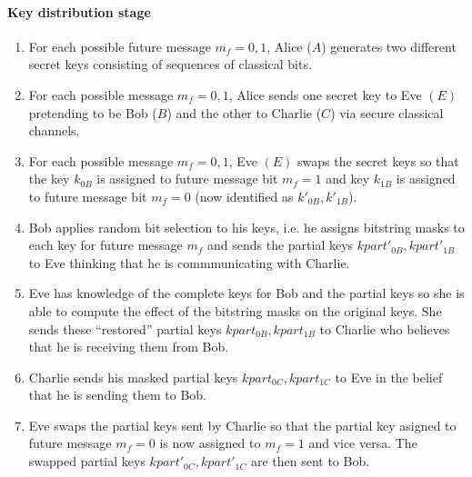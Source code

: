 \documentclass[english]{article}
\begin{document}
\paragraph{Key distribution stage}
\begin{enumerate}
\item For each possible future message $m_{f}=0,1$, Alice ($A$) generates
two different secret keys consisting of sequences of classical bits.
\item For each possible message $m_{f}=0,1$, Alice sends one secret key
to Eve $\left(E\right)$ pretending to be Bob ($B$) and the other
to Charlie ($C$) via secure classical channels.
\item For each possible message $m_{f}=0,1$, Eve $\left(E\right)$ swaps
the secret keys so that the key $k_{0B}$ is assigned to future message
bit $m_{f}=1$ and key $k_{1B}$ is assigned to future message bit
$m_{f}=0$ (now identified as $k'_{0B},k'_{1B}$).
\item Bob applies random bit selection to his keys, i.e. he assigns bitstring
masks to each key for future message $m_{f}$ and sends the partial
keys $kpart'_{0B},kpart'_{1B}$ to Eve thinking that he is commmunicating
with Charlie.
\item Eve has knowledge of the complete keys for Bob and the partial keys
so she is able to compute the effect of the bitstring masks on the
original keys. She sends these ``restored'' partial keys $kpart_{0B},kpart_{1B}$
to Charlie who believes that he is receiving them from Bob.
\item Charlie sends his masked partial keys $kpart_{0C},kpart_{1C}$ to
Eve in the belief that he is sending them to Bob.
\item Eve swaps the partial keys sent by Charlie so that the partial key
asigned to future message $m_{f}=0$ is now assigned to $m_{f}=1$
and vice versa. The swapped partial keys $kpart'_{0C},kpart'_{1C}$
are then sent to Bob.
\end{enumerate}
\end{document}
